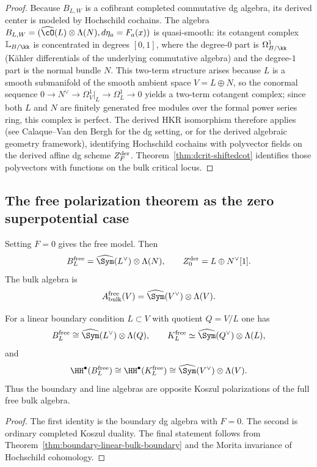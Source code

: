 \begin{proof}
Because $B_{L,W}$ is a cofibrant completed commutative dg algebra, its derived center is modeled by Hochschild cochains. The algebra $B_{L,W} = (\widehat{\cO}(L) \otimes \Lambda(N), d\eta_a = F_a(x))$ is quasi-smooth: its cotangent complex $\mathbb{L}_{B/\kk}$ is concentrated in degrees $[0,1]$, where the degree-$0$ part is $\Omega^1_{B/\kk}$ (K\"ahler differentials of the underlying commutative algebra) and the degree-$1$ part is the normal bundle $N$. This two-term structure arises because $L$ is a smooth submanifold of the smooth ambient space $V = L \oplus N$, so the conormal sequence $0 \to N^\vee \to \Omega^1_V|_L \to \Omega^1_L \to 0$ yields a two-term cotangent complex; since both $L$ and $N$ are finitely generated free modules over the formal power series ring, this complex is perfect. The derived HKR isomorphism therefore applies (see Calaque--Van den Bergh \cite{CVdB10} for the dg setting, or \cite[Theorem~7.8.3.3]{Lur18} for the derived algebraic geometry framework), identifying Hochschild cochains with polyvector fields on the derived affine dg scheme $Z_F^{\mathrm{der}}$. Theorem~\ref{thm:dcrit-shiftedcot} identifies those polyvectors with functions on the bulk critical locus.
\end{proof}

\subsection{The free polarization theorem as the zero superpotential case}

Setting $F=0$ gives the free model. Then
\[
B_L^{\free}
=
\widehat{\Sym}(L^\vee)\ot \Lambda(N),
\qquad
Z_0^{\der}=L\oplus N^\vee[1].
\]
The bulk algebra is
\[
A_{\mathrm{bulk}}^{\free}(V)
=
\widehat{\Sym}(V^\vee)\ot \Lambda(V).
\]

\begin{corollary}\label{cor:free-polarization}
For a linear boundary condition $L\subset V$ with quotient $Q=V/L$ one has
\[
B_L^{\free}\cong \widehat{\Sym}(L^\vee)\ot \Lambda(Q),
\qquad
K_L^{\free}\simeq \widehat{\Sym}(Q^\vee)\ot \Lambda(L),
\]
and
\[
\HH^\bullet(B_L^{\free})
\cong
\HH^\bullet(K_L^{\free})
\cong
\widehat{\Sym}(V^\vee)\ot \Lambda(V).
\]
Thus the boundary and line algebras are opposite Koszul polarizations of the full free bulk algebra.
\end{corollary}

\begin{proof}
The first identity is the boundary dg algebra with $F=0$. The second is ordinary completed Koszul duality. The final statement follows from Theorem~\ref{thm:boundary-linear-bulk-boundary} and the Morita invariance of Hochschild cohomology.
\end{proof}


